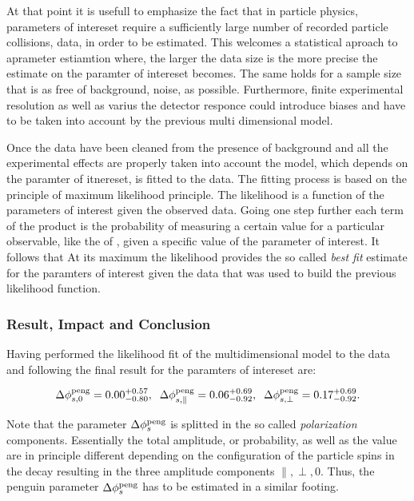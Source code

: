 At that point it is usefull to emphasize the fact that in particle physics, parameters of intereset
require a sufficiently large number of recorded particle collisions, data, in order to be estimated.
This welcomes a statistical aproach to aprameter estiamtion where, the larger the data size is the
more precise the estimate on the paramter of intereset becomes. The same holds for a sample size that
is as free of background, noise, as possible. Furthermore, finite experimental resolution as well as
varius the detector responce could introduce biases and have to be taken into account by the previous
multi dimensional model.

Once the data have been cleaned from the presence of background and all the experimental effects are
properly taken into account the model, which depends on the paramter of itnereset, is fitted to the data.
The fitting process is based on the principle of maximum likelihood principle. The likelihood is a
function of the parameters of interest given the observed data. Going one step further each term of
the product is the probability of measuring a certain value for a particular observable, like the
\mass{\Bs} of , given a specific value of the parameter of interest. It follows that
At its maximum the likelihood provides the so called {\it best fit} estimate for the paramters
of interest given the data that was used to build the previous likelihood function.

\subsubsection{Result, Impact and Conclusion}

Having performed the likelihood fit of the multidimensional model to the data and
following \cite{Fleischer:1999zi,Faller:2008gt,DeBruyn:2014oga,DeBruyn-thesis} the
final result for the paramters of intereset are:

\begin{equation}
\label{app_delta_phis_result}
  \Delta\phi^{\rm peng}_{s,{0}}         = 0.00 ^{+0.57}_{-0.80}, \;\;
  \Delta\phi^{\rm peng}_{s,{\parallel}} = 0.06 ^{+0.69}_{-0.92}, \;\;
  \Delta\phi^{\rm peng}_{s,{\perp}}     = 0.17 ^{+0.69}_{-0.92}.
\end{equation}


\noindent Note that the parameter $\Delta\phi_{s}^{\tiny\text{peng}}$ is splitted in the so called {\it polarization}
components. Essentially the total \BsJpsiPhi amplitude, or probability, as well as the \phis value
are in principle different depending on the configuration of the particle spins in the \BsJpsiPhi
decay resulting in the three amplitude components $\parallel,\perp,0$. Thus, the penguin parameter
$\Delta\phi_{s}^{\tiny\text{peng}}$ has to be estimated in a similar footing.

